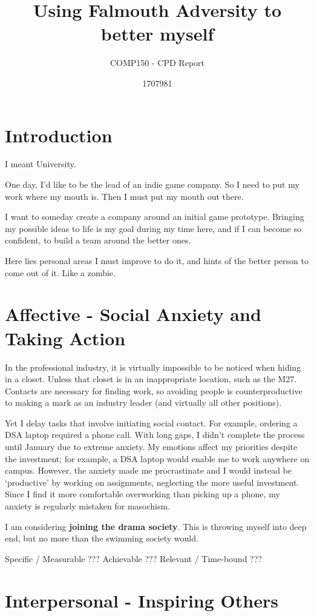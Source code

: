 \documentclass{scrartcl}
\title{Using Falmouth Adversity to better myself}
\subtitle{COMP150 - CPD Report}
\author{1707981}
\begin{document}
\maketitle

\section{Introduction}
I meant University.

One day, I'd like to be the lead of an indie game company. So I need to put my work where my mouth is. Then I must put my mouth out there.

I want to someday create a company around an initial game prototype. Bringing my possible ideas to life is my goal during my time here, and if I can become so confident, to build a team around the better ones.

Here lies personal areas I must improve to do it, and hints of the better person to come out of it. Like a zombie.

\section{Affective - Social Anxiety and Taking Action}
In the professional industry, it is virtually impossible to be noticed when hiding in a closet. Unless that closet is in an inappropriate location, such as the M27. Contacts are necessary for finding work, so avoiding people is counterproductive to making a mark as an industry leader (and virtually all other positions).

Yet I delay tasks that involve initiating social contact. For example, ordering a DSA laptop required a phone call. With long gaps, I didn't complete the process until January due to extreme anxiety. My emotions affect my priorities despite the investment; for example, a DSA laptop would enable me to work anywhere on campus. However, the anxiety made me procrastinate and I would instead be `productive' by working on assignments, neglecting the more useful investment. Since I find it more comfortable overworking than picking up a phone, my anxiety is regularly mistaken for masochism.

I am considering \textbf{joining the drama society}. This is throwing myself into deep end, but no more than the swimming society would. 

Specific    /
Measurable ???
Achievable ???
Relevant    /
Time-bound ???

\section{Interpersonal - Inspiring Others}
\end{document}
